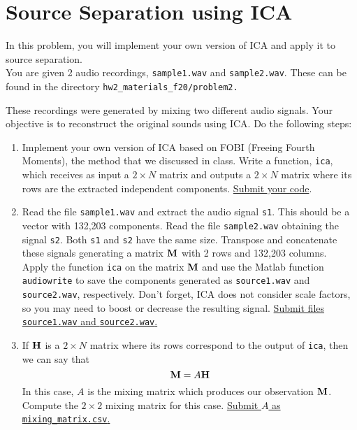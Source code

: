 \section{Source Separation using ICA}


In this problem, you will implement your own version of ICA and apply it to source separation.\\
You are given 2 audio recordings, \texttt{sample1.wav} and \texttt{sample2.wav}. These can be found in the directory
\texttt{hw2\_materials\_f20/problem2.}

These recordings were generated by mixing two different audio signals. Your objective is to reconstruct the original sounds using ICA. Do the following steps:
\begin{enumerate}

    \item Implement your own version of ICA based on FOBI (Freeing Fourth Moments), the method that we discussed in class. Write a function, \texttt{ica}, which receives as input a $2 \times N$ matrix and outputs a $2 \times N$ matrix where its rows are the extracted independent components. \ul{Submit your code}.
    
    \item Read the file \texttt{sample1.wav} and extract the audio signal \texttt{s1}. This should be a vector with 132,203 components. Read the file \texttt{sample2.wav} obtaining the signal \texttt{s2}. Both \texttt{s1} and \texttt{s2} have the same size. Transpose and concatenate these signals generating a matrix ${\bf M}$ with 2 rows and 132,203 columns.\\
    Apply the function \texttt{ica} on the matrix ${\bf M}$ and use the Matlab function \texttt{audiowrite} to save the components generated as \texttt{source1.wav} and \texttt{source2.wav}, respectively. Don't forget, ICA does not consider scale factors, so you may need to boost or decrease the resulting signal. \ul{Submit files \texttt{source1.wav} and \texttt{source2.wav}.}
    \item If ${\bf H}$ is a $2 \times N$ matrix where its rows correspond to the output of \texttt{ica}, then we can say that
    $$ {\bf M} = A {\bf H}$$
    In this case, $A$ is the mixing matrix which produces our observation ${\bf M}$. Compute the $2 \times 2$ mixing matrix for this case. \ul{Submit $A$ as \texttt{mixing\_matrix.csv}.} 
\end{enumerate}




